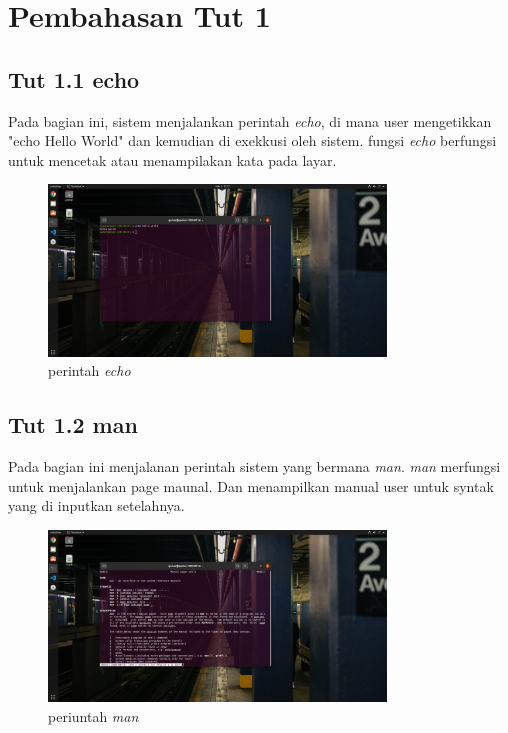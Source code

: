 \documentclass[11pt,a4paper]{article}
\begin{document}
\section{Pembahasan Tut 1}
\subsection{Tut 1.1 echo}
    Pada bagian ini, sistem menjalankan perintah \textit{echo}, di mana user mengetikkan "echo Hello World" dan kemudian di exekkusi oleh sistem.
	fungsi \textit{echo} berfungsi untuk mencetak atau menampilakan kata pada layar.
	\begin{figure}[h]
		\centering
		\includegraphics[width=0.8\textwidth]{figure/tut1_bagian1.png}
		\caption{perintah \textit{echo}}
	\end{figure}

\subsection{Tut 1.2 man}
	Pada bagian ini menjalanan perintah sistem yang bermana \textit{man}. \textit{man} merfungsi untuk menjalankan page maunal. Dan menampilkan manual user untuk syntak yang di inputkan setelahnya.
    
	\begin{figure}[h]
		\centering
		\includegraphics[width=0.8\textwidth]{figure/tut1_bagian2.png}
		\caption{periuntah \textit{man}}
	\end{figure}
\end{document}
